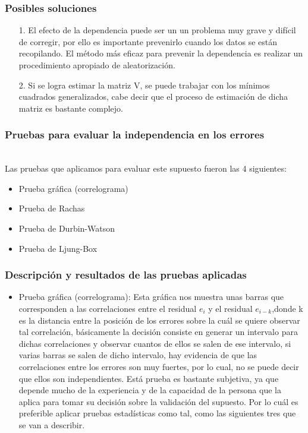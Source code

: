 \documentclass[12pt]{beamer}
\begin{document}
\begin{frame}
\frametitle{Posibles soluciones}
\begin{itemize}
\item[1.]El efecto de la dependencia puede ser un un problema muy grave y difícil de corregir, por ello es importante prevenirlo cuando los datos se están recopilando. El método más eficaz para prevenir la dependencia es realizar un procedimiento apropiado de aleatorización.
\item[2.]Si se logra estimar la matriz V, se puede trabajar con los mínimos cuadrados generalizados, cabe decir que el proceso de estimación de dicha matriz es bastante complejo.
\end{itemize}
\end{frame}

\begin{frame}
\frametitle{Pruebas para evaluar la independencia en los errores}
~\\ Las pruebas que aplicamos para evaluar este supuesto fueron las 4 siguientes:
\begin{itemize}
\item Prueba gráfica (correlograma)
\item Prueba de Rachas
\item Prueba de Durbin-Watson
\item Prueba de Ljung-Box
\end{itemize}
\end{frame}

\begin{frame}
\frametitle{Descripción y resultados de las pruebas aplicadas}
\begin{itemize}
\item Prueba gráfica (correlograma): Esta gráfica nos muestra unas barras que corresponden a las correlaciones entre el residual $e_{i}$ y el residual $e_{i-k}$,donde k es la distancia entre la posición de los errores sobre la cuál se quiere observar tal correlación, básicamente la decisión consiste en generar un intervalo para dichas correlaciones y observar cuantos de ellos se salen de ese intervalo, si varias barras se salen de dicho intervalo, hay evidencia de que las correlaciones entre los errores son muy fuertes, por lo cual, no se puede decir que ellos son independientes. Está prueba es bastante subjetiva, ya que depende mucho de la experiencia y de la capacidad de la persona que la aplica para tomar su decisión sobre la validación del supuesto. Por lo cuál es preferible aplicar pruebas estadísticas como tal, como las siguientes tres que se van a describir.
\end{itemize}
\end{frame}
\end{document}
